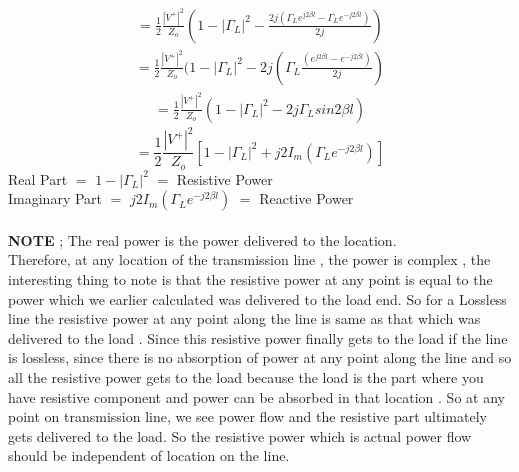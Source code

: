 \begin{align*} 
=\frac{1}{2} \frac{{ | V^+ | }^2}{Z_o} ( 1 - {|\Gamma_L}|^2 -\frac{2j(\Gamma_L e^{j2\beta l} - \Gamma_L e^{-j2\beta l})}{2j} )
\end{align*}
\begin{align*} 
=\frac{1}{2} \frac{{ | V^+ | }^2}{Z_o} ( 1 - {|\Gamma_L}|^2 -2j(\Gamma_L \frac{ ( e^{j2\beta l} - e^{-j2\beta l})}{2j}) 
\end{align*}
\begin{align*} 
=\frac{1}{2} \frac{{ | V^+ | }^2}{Z_o} ( 1 - {|\Gamma_L}|^2 -2j\Gamma_L sin2\beta l ) 
\end{align*}
\begin{equation} 
=\frac{1}{2} \frac{{ | V^+ | }^2}{Z_o}  [1 - {|\Gamma_L}|^2 + j2I_m(\Gamma_Le^{-j2\beta l})]
\end{equation}
Real Part $=$ $1 - {|\Gamma_L}|^2$ $=$ Resistive Power\\
Imaginary Part $=$ $ j2I_m(\Gamma_Le^{-j2\beta l})$ $=$ Reactive Power\\\\
\textbf{NOTE} ; The real power is the power delivered to the location.\\   
Therefore, at any location of the transmission line , the power is complex , the interesting thing to note is that the resistive power at any point is equal to the power which we earlier calculated was delivered to the load end. So for a Lossless line the resistive power at any point along the line is same as that which was delivered to the load . Since  this resistive power finally gets to the load if the line is lossless, since there is no absorption of power at any point along the line and so all the resistive power gets to the load because the load is the part where you have resistive component and power can be  absorbed in that location . So at any point on transmission line, we see power flow and the resistive part ultimately gets delivered to the load.  So the resistive power which is actual power flow should be independent of location on the line.

